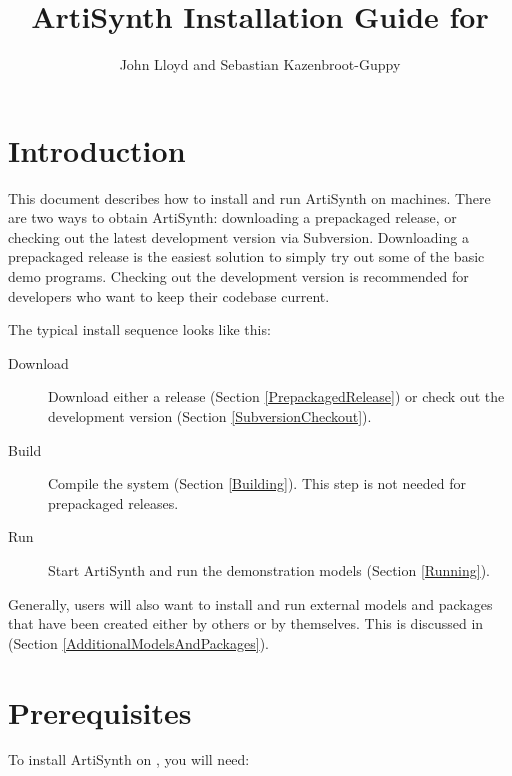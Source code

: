 \title{ArtiSynth Installation Guide for \SYSTEM}
\author{John Lloyd and Sebastian Kazenbroot-Guppy}
\iflatexml
\date{}
\fi



\maketitle

\iflatexml{\large\today}\fi

\tableofcontents

\section{Introduction}

This document describes how to install and run ArtiSynth on \FULLSYSTEM
machines. There are two ways to obtain ArtiSynth: downloading
a prepackaged release, or checking out the latest development version
via Subversion. Downloading a prepackaged release is the easiest
solution to simply try out some of the basic demo programs. Checking
out the development version is recommended for developers who want to
keep their codebase current.

The typical install sequence looks like this:

\begin{description}

\item[Download]
Download either a release (Section \ref{PrepackagedRelease}) or 
check out the development version (Section \ref{SubversionCheckout}).

\item[Build]
Compile the system (Section \ref{Building}). This
step is not needed for prepackaged releases.

\item[Run] 
Start ArtiSynth and run the demonstration models (Section \ref{Running}).

\end{description}

Generally, users will also want to install and run external models and
packages that have been created either by others or by themselves.
This is discussed in (Section \ref{AdditionalModelsAndPackages}).

\section{Prerequisites}

To install ArtiSynth on \SYSTEM, you will need:

